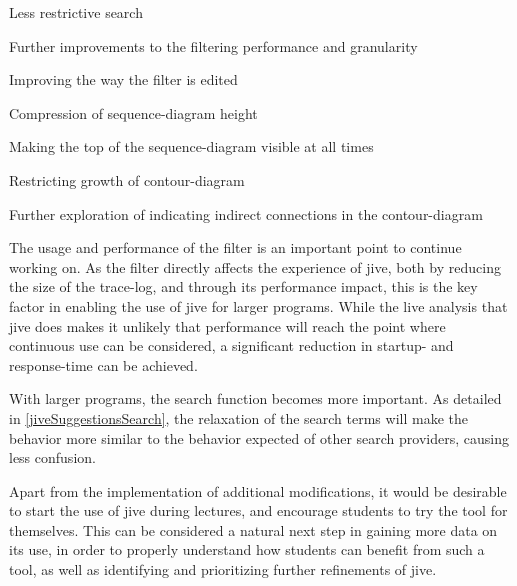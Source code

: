 \begin{itemize*}
	\item{Less restrictive search}
	\item{Further improvements to the filtering performance and granularity}
	\item{Improving the way the filter is edited}
	\item{Compression of sequence-diagram height}
	\item{Making the top of the sequence-diagram visible at all times}
	\item{Restricting growth of contour-diagram}
	\item{Further exploration of indicating indirect connections in the contour-diagram}
\end{itemize*}

The usage and performance of the filter is an important point to continue working on.
As the filter directly affects the experience of \gls{jive}, both by reducing the size of the trace-log, and through its performance impact, this is the key factor in enabling the use of \gls{jive} for larger programs.
While the live analysis that \gls{jive} does makes it unlikely that performance will reach the point where continuous use can be considered, a significant reduction in startup- and response-time can be achieved.

With larger programs, the search function becomes more important.
As detailed in \cref{jiveSuggestionsSearch}, the relaxation of the search terms will make the behavior more similar to the behavior expected of other search providers, causing less confusion.

Apart from the implementation of additional modifications, it would be desirable to start the use of \gls{jive} during lectures, and encourage students to try the tool for themselves.
This can be considered a natural next step in gaining more data on its use, in order to properly understand how students can benefit from such a tool, as well as identifying and prioritizing further refinements of \gls{jive}.


